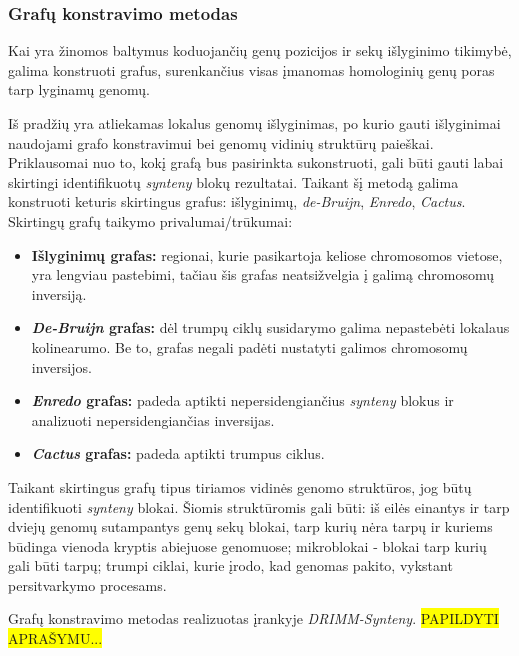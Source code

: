 \documentclass[12pt]{article}
\begin{document}
\subsubsection*{Grafų konstravimo metodas}
Kai yra žinomos baltymus koduojančių genų pozicijos ir sekų išlyginimo
tikimybė, galima konstruoti grafus, surenkančius visas įmanomas homologinių genų
poras tarp lyginamų genomų.

Iš pradžių yra atliekamas lokalus genomų išlyginimas, po kurio gauti
išlyginimai naudojami grafo konstravimui bei genomų vidinių struktūrų paieškai.
Priklausomai nuo to, kokį grafą bus pasirinkta sukonstruoti, gali būti gauti
labai skirtingi identifikuotų \emph{synteny} blokų rezultatai. Taikant šį
metodą galima konstruoti keturis skirtingus grafus: išlyginimų,
\emph{de-Bruijn}, \emph{Enredo}, \emph{Cactus}. Skirtingų grafų taikymo
privalumai/trūkumai:

\begin{itemize}
    \item \textbf{Išlyginimų grafas:} regionai, kurie pasikartoja keliose
    chromosomos vietose, yra lengviau pastebimi, tačiau šis grafas neatsižvelgia
    į galimą chromosomų inversiją.
    \item \textbf{\emph{De-Bruijn} grafas:} dėl trumpų ciklų susidarymo galima
    nepastebėti lokalaus kolinearumo. Be to, grafas negali padėti nustatyti
    galimos chromosomų inversijos.
    \item \textbf{\emph{Enredo} grafas:} padeda aptikti nepersidengiančius
    \emph{synteny} blokus ir analizuoti nepersidengiančias inversijas.
    \item \textbf{\emph{Cactus} grafas:} padeda aptikti trumpus ciklus.
\end{itemize}

Taikant skirtingus grafų tipus tiriamos vidinės genomo struktūros, jog būtų
identifikuoti \emph{synteny} blokai. Šiomis struktūromis gali būti: iš eilės
einantys ir tarp dviejų genomų sutampantys genų sekų blokai, tarp kurių nėra
tarpų ir kuriems būdinga vienoda kryptis abiejuose genomuose; mikroblokai -
blokai tarp kurių gali būti tarpų; trumpi ciklai, kurie įrodo, kad genomas
pakito, vykstant persitvarkymo procesams.

Grafų konstravimo metodas realizuotas įrankyje
\emph{DRIMM-Synteny}\cite{DRIMM-SYNTENY}.
\colorbox{yellow}{PAPILDYTI APRAŠYMU...}


\end{document}
